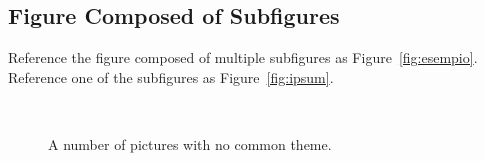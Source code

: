 \documentclass[
10pt, %
a4paper, %
oneside, %
headinclude,footinclude, %
BCOR5mm, %
]{scrartcl}
\begin{document}
\subsection{Figure Composed of Subfigures}

Reference the figure composed of multiple subfigures as Figure~\vref{fig:esempio}. Reference one of the subfigures as Figure~\vref{fig:ipsum}. %

\lipsum[15-18] %

\begin{figure}[tb]
\centering
{} \quad
{} \\
 \quad
{}
\caption[A number of pictures.]{A number of pictures with no common theme.} %
\label{fig:esempio}
\end{figure}


\renewcommand{\refname}{\spacedlowsmallcaps{References}} %




\end{document}
